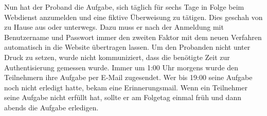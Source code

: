 Nun hat der Proband die Aufgabe, sich täglich für sechs Tage in Folge beim 
Webdienst anzumelden und eine fiktive Überweisung zu tätigen. Dies geschah von 
zu Hause aus oder unterwegs. Dazu muss er nach der Anmeldung mit Benutzername 
und Passwort immer den zweiten Faktor mit dem neuen Verfahren automatisch in 
die Website übertragen lassen. Um den Probanden nicht unter Druck zu setzen, 
wurde nicht kommuniziert, dass die benötigte Zeit zur Authentisierung gemessen 
wurde. Immer um 1:00 Uhr morgens wurde den Teilnehmern ihre Aufgabe per E-Mail 
zugesendet. Wer bis 19:00 seine Aufgabe noch nicht erledigt hatte, bekam eine 
Erinnerungsmail. Wenn ein Teilnehmer seine Aufgabe nicht erfüllt hat, sollte er 
am Folgetag einmal früh und dann abends die Aufgabe erledigen.